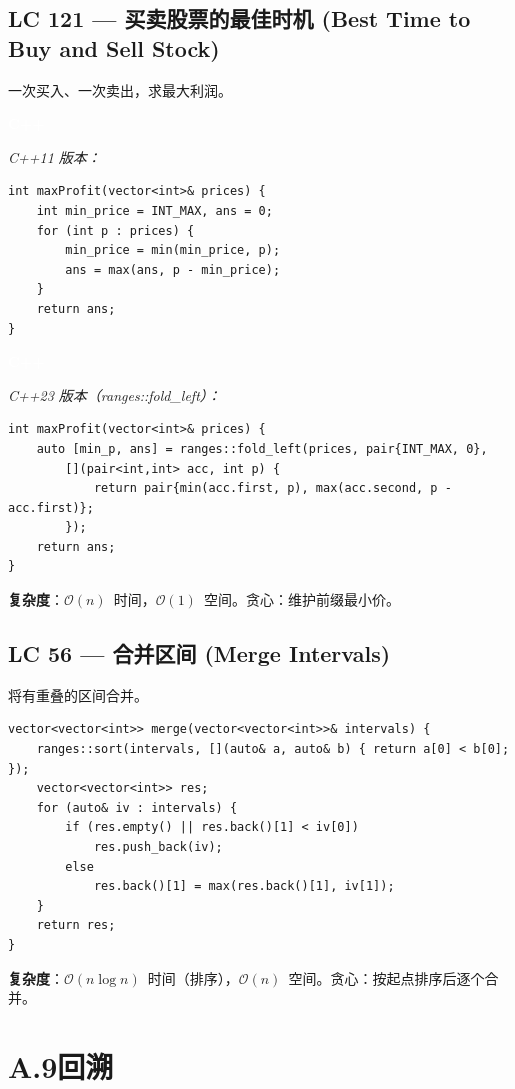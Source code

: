 \documentclass[12pt,a4paper,fontset=fandol]{ctexbook}
\newcommand{\cpplabel}{%
  \noindent\begin{tcolorbox}[sharp corners,colback=cppheadbg,colframe=cppheadbg,
    left=6pt,right=6pt,top=2pt,bottom=2pt,boxrule=0pt]
  \textcolor{white}{\small\bfseries\sffamily C++}\end{tcolorbox}%
}
\newcommand{\bigO}[1]{\mathcal{O}(#1)}
\begin{document}
\subsection*{LC 121 — 买卖股票的最佳时机 (Best Time to Buy and Sell Stock)}

一次买入、一次卖出，求最大利润。

\cpplabel\noindent\textit{C++11 版本：}
\begin{lstlisting}[style=cppstyle]
int maxProfit(vector<int>& prices) {
    int min_price = INT_MAX, ans = 0;
    for (int p : prices) {
        min_price = min(min_price, p);
        ans = max(ans, p - min_price);
    }
    return ans;
}
\end{lstlisting}

\cpplabel\noindent\textit{C++23 版本（ranges::fold\_left）：}
\begin{lstlisting}[style=cppstyle]
int maxProfit(vector<int>& prices) {
    auto [min_p, ans] = ranges::fold_left(prices, pair{INT_MAX, 0},
        [](pair<int,int> acc, int p) {
            return pair{min(acc.first, p), max(acc.second, p - acc.first)};
        });
    return ans;
}
\end{lstlisting}
\textbf{复杂度}：$\bigO{n}$~时间，$\bigO{1}$~空间。贪心：维护前缀最小价。

\subsection*{LC 56 — 合并区间 (Merge Intervals)}

将有重叠的区间合并。

\begin{lstlisting}[style=cppstyle]
vector<vector<int>> merge(vector<vector<int>>& intervals) {
    ranges::sort(intervals, [](auto& a, auto& b) { return a[0] < b[0]; });
    vector<vector<int>> res;
    for (auto& iv : intervals) {
        if (res.empty() || res.back()[1] < iv[0])
            res.push_back(iv);
        else
            res.back()[1] = max(res.back()[1], iv[1]);
    }
    return res;
}
\end{lstlisting}
\textbf{复杂度}：$\bigO{n\log n}$~时间（排序），$\bigO{n}$~空间。贪心：按起点排序后逐个合并。

\section*{A.9\quad 回溯}
\end{document}
